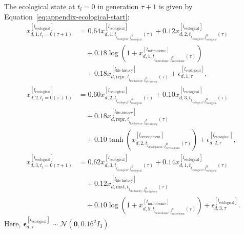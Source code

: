\documentclass[11pt]{article}
\begin{document}
The ecological state at $t_l=0$ in generation $\tau+1$ is given by Equation~\ref{eq:appendix-ecological-start}:
\begin{equation}
\begin{aligned}
x^{[l_{\mathrm{ecological}}]}_{d,1,t_l=0(\tau+1)}
&=0.64x^{[l_{\mathrm{ecological}}]}_{d,1,t_{l_{\mathrm{ecological}},j_{\mathrm{ecological}}^R}(\tau)}
+0.12x^{[l_{\mathrm{ecological}}]}_{d,2,t_{l_{\mathrm{ecological}},j_{\mathrm{ecological}}^R}(\tau)}\\
&\quad
+0.18\log\!\left(
1+x^{[l_{\mathrm{microbiome}}]}_{d,1,t_{l_{\mathrm{microbiome}},j_{\mathrm{microbiome}}^R}(\tau)}
\right)\\
&\quad
+0.18x^{[l_{\mathrm{life\text{-}history}}]}_{d,\mathrm{repr},t_{l_{\mathrm{life\text{-}history}},j_{\mathrm{life\text{-}history}}^R}(\tau)}
+\epsilon^{[l_{\mathrm{ecological}}]}_{d,1,\tau},\\
x^{[l_{\mathrm{ecological}}]}_{d,2,t_l=0(\tau+1)}
&=0.60x^{[l_{\mathrm{ecological}}]}_{d,2,t_{l_{\mathrm{ecological}},j_{\mathrm{ecological}}^R}(\tau)}
+0.10x^{[l_{\mathrm{ecological}}]}_{d,3,t_{l_{\mathrm{ecological}},j_{\mathrm{ecological}}^R}(\tau)}\\
&\quad
+0.18x^{[l_{\mathrm{life\text{-}history}}]}_{d,\mathrm{repr},t_{l_{\mathrm{life\text{-}history}},j_{\mathrm{life\text{-}history}}^R}(\tau)}\\
&\quad
+0.10\tanh\!\left(
x^{[l_{\mathrm{development}}]}_{d,2,t_{l_{\mathrm{development}},j_{\mathrm{development}}^R}(\tau)}
\right)
+\epsilon^{[l_{\mathrm{ecological}}]}_{d,2,\tau},\\
x^{[l_{\mathrm{ecological}}]}_{d,3,t_l=0(\tau+1)}
&=0.62x^{[l_{\mathrm{ecological}}]}_{d,3,t_{l_{\mathrm{ecological}},j_{\mathrm{ecological}}^R}(\tau)}
+0.14x^{[l_{\mathrm{ecological}}]}_{d,1,t_{l_{\mathrm{ecological}},j_{\mathrm{ecological}}^R}(\tau)}\\
&\quad
+0.12x^{[l_{\mathrm{life\text{-}history}}]}_{d,\mathrm{mat},t_{l_{\mathrm{life\text{-}history}},j_{\mathrm{life\text{-}history}}^R}(\tau)}\\
&\quad
+0.10\log\!\left(
1+x^{[l_{\mathrm{microbiome}}]}_{d,5,t_{l_{\mathrm{microbiome}},j_{\mathrm{microbiome}}^R}(\tau)}
\right)
+\epsilon^{[l_{\mathrm{ecological}}]}_{d,3,\tau}.
\end{aligned}
\label{eq:appendix-ecological-start}
\end{equation}
Here, $\boldsymbol{\epsilon}^{[l_{\mathrm{ecological}}]}_{d,\tau}\sim\mathcal{N}(\mathbf{0},0.16^2I_3)$.
\end{document}
